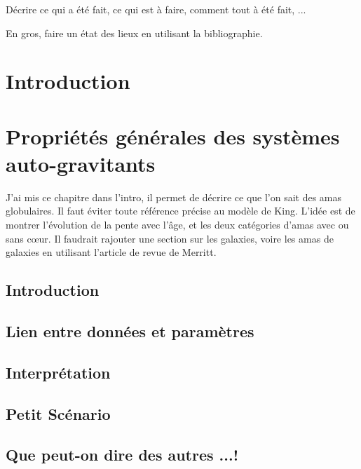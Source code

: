 Décrire ce qui a été fait, ce qui est à faire, comment tout à été fait, ...

En gros, faire un état des lieux en utilisant la bibliographie.

\chapter{Introduction}%
	\minitoc
	  
		
		
\chapter{Propriétés générales des systèmes auto-gravitants}

J'ai mis ce chapitre dans l'intro, il permet de décrire ce que l'on sait des amas globulaires. Il faut éviter toute référence précise au modèle de King. L'idée est de montrer l'évolution de la pente avec l'âge, et les deux catégories d'amas avec ou sans c\oe ur.
 Il faudrait rajouter une section sur les galaxies, voire les amas de galaxies en utilisant l'article de revue de Merritt.

	\minitoc
	\section{Introduction}
		

	\section[Lien]{Lien entre données et paramètres\label{amas}}
		

	\section{Interprétation}
		

	\section{Petit Scénario\label{petit_scenar}}
		

	\section{Que peut-on dire des autres ...!}
		

	

